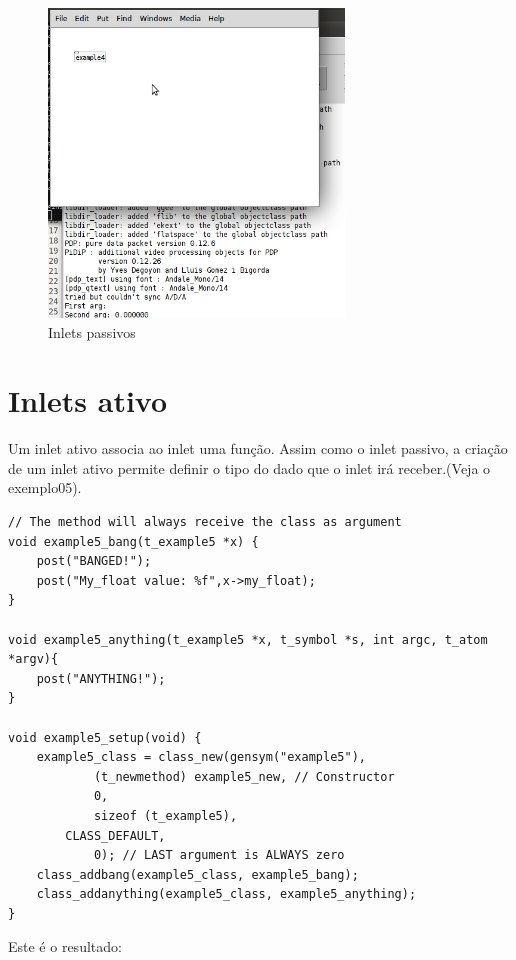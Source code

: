 \documentclass[10pt,a4paper]{report}
\begin{document}
\begin{figure}[h!]
	\centering
	\includegraphics[width=0.7\textwidth]{example4}
	\caption{Inlets passivos}
\end{figure}

\section{Inlets ativo}
Um inlet ativo associa ao inlet uma função. Assim como o inlet passivo, a criação de um inlet ativo permite definir o tipo do dado que o inlet irá receber.(Veja o exemplo05).

\begin{lstlisting}
// The method will always receive the class as argument
void example5_bang(t_example5 *x) { 
    post("BANGED!");
    post("My_float value: %f",x->my_float);
}

void example5_anything(t_example5 *x, t_symbol *s, int argc, t_atom *argv){
	post("ANYTHING!");
}

void example5_setup(void) {
    example5_class = class_new(gensym("example5"),
            (t_newmethod) example5_new, // Constructor
            0, 
            sizeof (t_example5),
	    CLASS_DEFAULT,
            0); // LAST argument is ALWAYS zero
    class_addbang(example5_class, example5_bang);
    class_addanything(example5_class, example5_anything);
}
\end{lstlisting}

Este é o resultado:
\end{document}
